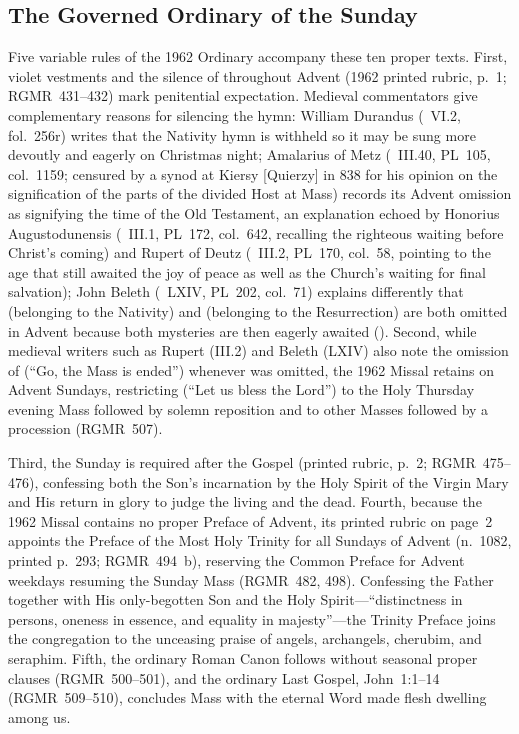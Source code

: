 \subsection{The Governed Ordinary of the Sunday}

Five variable rules of the 1962 Ordinary accompany these ten proper texts. First, violet vestments and the silence of  throughout Advent  (1962 printed rubric, p.~1; RGMR~431--432) mark penitential expectation. Medieval commentators give complementary reasons for silencing the hymn: William Durandus (~VI.2, fol.~256r) writes that the Nativity hymn is withheld so it may be sung more devoutly and eagerly on Christmas night; Amalarius of Metz (~III.40, PL~105, col.~1159; censured by a synod at Kiersy [Quierzy] in 838 for his opinion on the signification of the parts of the divided Host at Mass) records its Advent omission as signifying the time of the Old Testament, an explanation echoed by Honorius Augustodunensis (~III.1, PL~172, col.~642, recalling the righteous waiting before Christ's coming) and Rupert of Deutz (~III.2, PL~170, col.~58, pointing to the age that still awaited the joy of peace as well as the Church's waiting for final salvation); John Beleth (~LXIV, PL~202, col.~71) explains differently that  (belonging to the Nativity) and  (belonging to the Resurrection) are both omitted in Advent because both mysteries are then eagerly awaited (). Second, while medieval writers such as Rupert (III.2) and Beleth (LXIV) also note the omission of  (``Go, the Mass is ended'') whenever  was omitted, the 1962 Missal retains  on Advent Sundays, restricting  (``Let us bless the Lord'') to the Holy Thursday evening Mass followed by solemn reposition and to other Masses followed by a procession (RGMR~507).

Third, the Sunday  is required after the Gospel (printed rubric, p.~2; RGMR~475--476), confessing both the Son's incarnation by the Holy Spirit of the Virgin Mary and His return in glory to judge the living and the dead. Fourth, because the 1962 Missal contains no proper Preface of Advent, its printed rubric on page~2 appoints the Preface of the Most Holy Trinity for all Sundays of Advent (n.~1082, printed p.~293; RGMR~494~b), reserving the Common Preface for Advent weekdays resuming the Sunday Mass (RGMR~482, 498). Confessing the Father together with His only-begotten Son and the Holy Spirit---``distinctness in persons, oneness in essence, and equality in majesty''---the Trinity Preface joins the congregation to the unceasing praise of angels, archangels, cherubim, and seraphim. Fifth, the ordinary Roman Canon follows without seasonal proper clauses (RGMR~500--501), and the ordinary Last Gospel, John~1:1--14 (RGMR~509--510), concludes Mass with the eternal Word made flesh dwelling among us.
